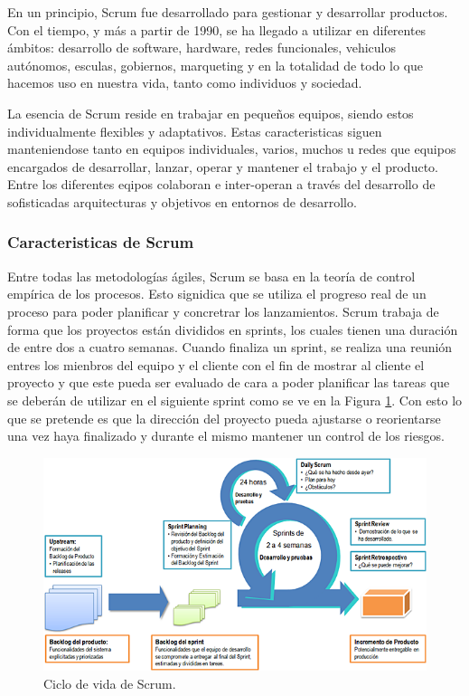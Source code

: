 En un principio, Scrum fue desarrollado para gestionar y desarrollar productos. Con el tiempo, y más a partir de 1990, se ha llegado a utilizar en diferentes ámbitos: desarrollo de software, hardware, redes funcionales, vehiculos autónomos, esculas, gobiernos, marqueting y en la totalidad de todo lo que hacemos uso en nuestra vida, tanto como individuos y sociedad.

La esencia de Scrum reside en trabajar en pequeños equipos, siendo estos individualmente flexibles y adaptativos. Estas caracteristicas siguen manteniendose tanto en equipos individuales, varios, muchos u redes que equipos encargados de desarrollar, lanzar, operar y mantener el trabajo y el producto. Entre los diferentes eqipos colaboran e inter-operan a través del desarrollo de sofisticadas arquitecturas y objetivos en entornos de desarrollo.

\subsubsection{Caracteristicas de Scrum}

Entre todas las metodologías ágiles, Scrum se basa en la teoría de control empírica de los procesos. Esto signidica que se utiliza el progreso real de un proceso para poder planificar y concretrar los lanzamientos. Scrum trabaja de forma que los proyectos están divididos en sprints, los cuales tienen una duración de entre dos a cuatro semanas. Cuando finaliza un sprint, se realiza una reunión entres los mienbros del equipo y el cliente con el fin de mostrar al cliente el proyecto y que este pueda ser evaluado de cara a poder planificar las tareas que se deberán de utilizar en el siguiente sprint como se ve en la Figura \ref{fig:scrum}. Con esto lo que se pretende es que la dirección del proyecto pueda ajustarse o reorientarse una vez haya finalizado y durante el mismo mantener un control de los riesgos.

\begin{figure}[h]
	\centering
	\includegraphics[width=1\textwidth]{img/scrum}
	\caption{Ciclo de vida de Scrum.}
	\label{fig:scrum}
\end{figure}

